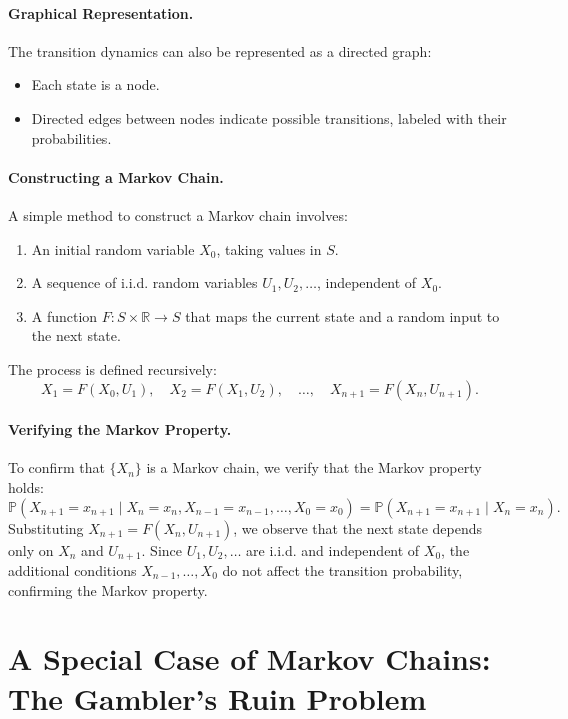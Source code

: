 \paragraph{Graphical Representation.}
The transition dynamics can also be represented as a directed graph:
\begin{itemize}
    \item Each state is a node.
    \item Directed edges between nodes indicate possible transitions, labeled with their probabilities.
\end{itemize}

\paragraph{Constructing a Markov Chain.}
A simple method to construct a Markov chain involves:
\begin{enumerate}
    \item An initial random variable \( X_0 \), taking values in \( S \).
    \item A sequence of i.i.d. random variables \( U_1, U_2, \dots \), independent of \( X_0 \).
    \item A function \( F: S \times \mathbb{R} \to S \) that maps the current state and a random input to the next state.
\end{enumerate}
The process is defined recursively:
\[
X_1 = F(X_0, U_1), \quad X_2 = F(X_1, U_2), \quad \dots, \quad X_{n+1} = F(X_n, U_{n+1}).
\]

\paragraph{Verifying the Markov Property.}
To confirm that \( \{X_n\} \) is a Markov chain, we verify that the Markov property holds:
\[
\mathbb{P}(X_{n+1} = x_{n+1} \mid X_n = x_n, X_{n-1} = x_{n-1}, \dots, X_0 = x_0) = \mathbb{P}(X_{n+1} = x_{n+1} \mid X_n = x_n).
\]
Substituting \( X_{n+1} = F(X_n, U_{n+1}) \), we observe that the next state depends only on \( X_n \) and \( U_{n+1} \). Since \( U_1, U_2, \dots \) are i.i.d. and independent of \( X_0 \), the additional conditions \( X_{n-1}, \dots, X_0 \) do not affect the transition probability, confirming the Markov property.

\section{A Special Case of Markov Chains: The Gambler’s Ruin Problem}

